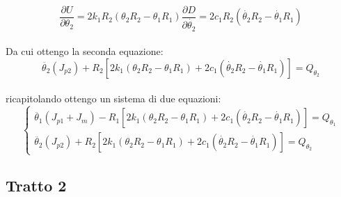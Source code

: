 \documentclass{article}
\begin{document}
\begin{equation*}
\frac{\partial U}{\partial \theta_{2}} = 2k_{1}R_{2}(\theta_{2}R_{2} - \theta_{1}R_{1})
\frac{\partial D}{\partial \dot{\theta_{2}}} = 2c_{1}R_{2}(\dot{\theta_{2}}R_{2} - \dot{\theta_{1}}R_{1})
\end{equation*}
\\
Da cui ottengo la seconda equazione: 
\\
\begin{equation*}
 \ddot{\theta_{2}}(J_{p2}) + R_{2}[2k_{1}(\theta_{2}R_{2}-\theta_{1}R_{1})+ 2c_{1}(\dot{\theta_{2}}R_{2}-\dot{\theta_{1}}R_{1})] = Q_{\theta_2}
\end{equation*}
\\
ricapitolando ottengo un sistema di due equazioni:
\begin{equation*}
\begin{cases}
\ddot{\theta_{1}}(J_{p1}+J_{m}) - R_{1}[2k_{1}(\theta_{2}R_{2}-\theta_{1}R_{1})+ 2c_{1}(\dot{\theta_{2}}R_{2}-\dot{\theta_{1}}R_{1})] = Q_{\theta_1}\\

\ddot{\theta_{2}}(J_{p2}) + R_{2}[2k_{1}(\theta_{2}R_{2}-\theta_{1}R_{1})+ 2c_{1}(\dot{\theta_{2}}R_{2}-\dot{\theta_{1}}R_{1})] = Q_{\theta_2}
\end{cases}
\end{equation*}

\subsection{Tratto 2}
\end{document}
